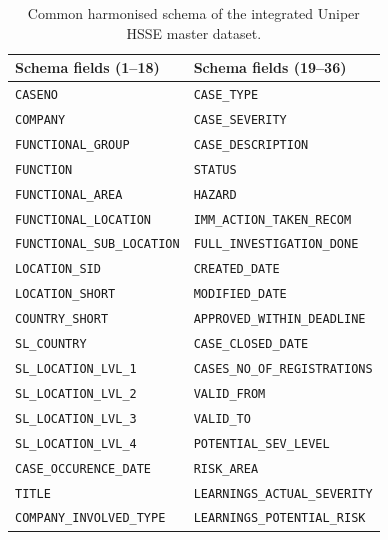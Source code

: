 \documentclass[11pt, titlepage, bibliography=totoc]{scrreprt}
\begin{document}
\begin{table}[htbp]
\centering
\caption{Common harmonised schema of the integrated Uniper HSSE master dataset.}
\label{tab:harmonised_schema}
\small
\renewcommand{\arraystretch}{1.15}
\begin{tabular}{p{}p{}}
\toprule
\textbf{Schema fields (1--18)} & \textbf{Schema fields (19--36)} \\
\midrule
\texttt{CASENO} &
\texttt{CASE\_TYPE} \\

\texttt{COMPANY} &
\texttt{CASE\_SEVERITY} \\

\texttt{FUNCTIONAL\_GROUP} &
\texttt{CASE\_DESCRIPTION} \\

\texttt{FUNCTION} &
\texttt{STATUS} \\

\texttt{FUNCTIONAL\_AREA} &
\texttt{HAZARD} \\

\texttt{FUNCTIONAL\_LOCATION} &
\texttt{IMM\_ACTION\_TAKEN\_RECOM} \\

\texttt{FUNCTIONAL\_SUB\_LOCATION} &
\texttt{FULL\_INVESTIGATION\_DONE} \\

\texttt{LOCATION\_SID} &
\texttt{CREATED\_DATE} \\

\texttt{LOCATION\_SHORT} &
\texttt{MODIFIED\_DATE} \\

\texttt{COUNTRY\_SHORT} &
\texttt{APPROVED\_WITHIN\_DEADLINE} \\

\texttt{SL\_COUNTRY} &
\texttt{CASE\_CLOSED\_DATE} \\

\texttt{SL\_LOCATION\_LVL\_1} &
\texttt{CASES\_NO\_OF\_REGISTRATIONS} \\

\texttt{SL\_LOCATION\_LVL\_2} &
\texttt{VALID\_FROM} \\

\texttt{SL\_LOCATION\_LVL\_3} &
\texttt{VALID\_TO} \\

\texttt{SL\_LOCATION\_LVL\_4} &
\texttt{POTENTIAL\_SEV\_LEVEL} \\

\texttt{CASE\_OCCURENCE\_DATE} &
\texttt{RISK\_AREA} \\

\texttt{TITLE} &
\texttt{LEARNINGS\_ACTUAL\_SEVERITY} \\

\texttt{COMPANY\_INVOLVED\_TYPE} &
\texttt{LEARNINGS\_POTENTIAL\_RISK} \\
\bottomrule
\end{tabular}
\end{table}
\end{document}
